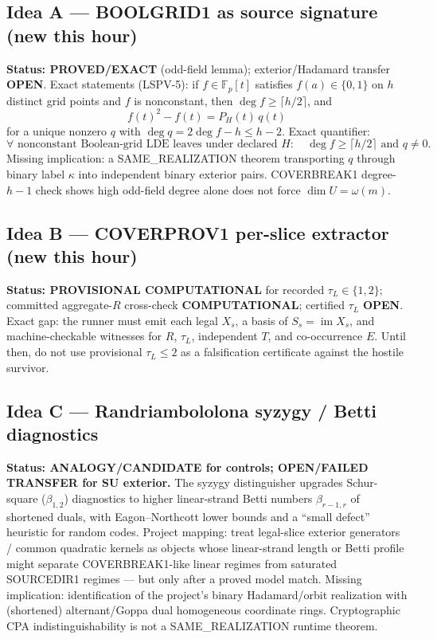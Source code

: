 \documentclass[11pt]{article}
\begin{document}
\subsection*{Idea A --- BOOLGRID1 as source signature (new this hour)}
\textbf{Status: PROVED/EXACT} (odd-field lemma); exterior/Hadamard transfer \textbf{OPEN}.
Exact statements (LSPV-5): if $f\in\mathbb F_p[t]$ satisfies $f(a)\in\{0,1\}$ on $h$ distinct
grid points and $f$ is nonconstant, then $\deg f\ge\lceil h/2\rceil$, and
\[
f(t)^2-f(t)=P_H(t)\,q(t)
\]
for a unique nonzero $q$ with $\deg q=2\deg f-h\le h-2$.
Exact quantifier:
\[
\forall\text{ nonconstant Boolean-grid LDE leaves under declared }H:\quad
\deg f\ge\lceil h/2\rceil\text{ and }q\neq 0.
\]
Missing implication: a SAME\_REALIZATION theorem transporting $q$ through binary label
$\kappa$ into independent binary exterior pairs. COVERBREAK1 degree-$h-1$ check shows
high odd-field degree alone does not force $\dim U=\omega(m)$.

\subsection*{Idea B --- COVERPROV1 per-slice extractor (new this hour)}
\textbf{Status: PROVISIONAL COMPUTATIONAL} for recorded $\tau_L\in\{1,2\}$;
committed aggregate-$R$ cross-check \textbf{COMPUTATIONAL}; certified $\tau_L$ \textbf{OPEN}.
Exact gap: the runner must emit each legal $X_s$, a basis of $S_s=\operatorname{im}X_s$, and
machine-checkable witnesses for $R$, $\tau_L$, independent $T$, and co-occurrence $E$.
Until then, do not use provisional $\tau_L\le 2$ as a falsification certificate against the
hostile survivor.

\subsection*{Idea C --- Randriambololona syzygy / Betti diagnostics}
\textbf{Status: ANALOGY/CANDIDATE for controls; OPEN/FAILED TRANSFER for SU exterior.}
The syzygy distinguisher upgrades Schur-square ($\beta_{1,2}$) diagnostics to higher linear-strand
Betti numbers $\beta_{r-1,r}$ of shortened duals, with Eagon--Northcott lower bounds and a
``small defect'' heuristic for random codes. Project mapping: treat legal-slice exterior
generators / common quadratic kernels as objects whose linear-strand length or Betti profile
might separate COVERBREAK1-like linear regimes from saturated SOURCEDIR1 regimes --- but only
after a proved model match. Missing implication: identification of the project's binary
Hadamard/orbit realization with (shortened) alternant/Goppa dual homogeneous coordinate
rings. Cryptographic CPA indistinguishability is not a SAME\_REALIZATION runtime theorem.
\end{document}

